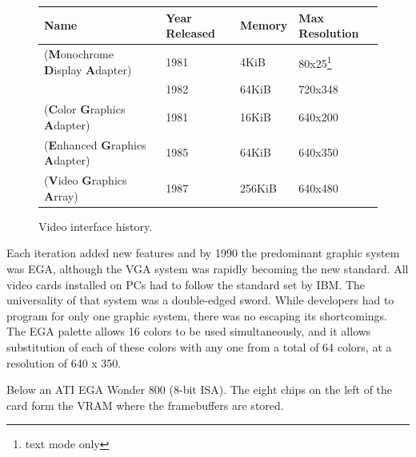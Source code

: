 \documentclass[book.tex]{subfiles}
\begin{document}
 \begin{figure}[H]
\centering  
\begin{tabularx}{\textwidth}{ l X l Y }
  \toprule
  \textbf{Name} &  \textbf{Year Released} & \textbf{Memory} & \textbf{Max Resolution}\\
  \toprule {}
   (\textbf{M}onochrome
   \textbf{D}isplay
   \textbf{A}dapter) & 1981 & 4KiB & 80x25\footnote{text mode only}
   \\  & 1982 & 64KiB & 720x348
   \\ 
   (\textbf{C}olor
   \textbf{G}raphics
   \textbf{A}dapter) & 1981 & 16KiB & 640x200
    \\ 
   (\textbf{E}nhanced
   \textbf{G}raphics
   \textbf{A}dapter) & 1985 & 64KiB & 640x350
   \\ 
   (\textbf{V}ideo
   \textbf{G}raphics
   \textbf{A}rray)  & 1987 & 256KiB & 640x480
    \\
  \toprule
\end{tabularx}
\caption{Video interface history.}\label{fig:vga_history}
\end{figure}

Each iteration added new features and by 1990 the predominant graphic system was EGA, although the VGA system was rapidly becoming the new standard. All video cards installed on PCs had to follow the standard set by IBM. The universality of that system was a double-edged sword. While developers had to program for only one graphic system, there was no escaping its shortcomings.\\

The EGA palette allows 16  colors to be used simultaneously, and it allows substitution of each of these colors with any one from a total of 64 colors, at a resolution of 640 x 350.\\
\par
Below an ATI EGA Wonder 800 (8-bit ISA). The eight chips on the left of the card form the VRAM where the framebuffers are stored\protect\footnotemark. 

\begin{figure}[H] 
  \centering 
  
\end{figure}
\par
\pagebreak
\end{document}
